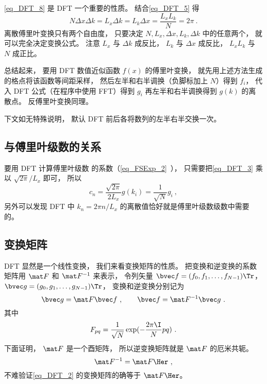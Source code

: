 \autoref{eq_DFT_8} 是 DFT 一个重要的性质。 结合\autoref{eq_DFT_5} 得
\begin{equation}\label{eq_DFT_9}
N\Delta x \Delta k = L_x \Delta k = L_k \Delta x = \frac{L_x L_k}{N} = 2\pi~.
\end{equation}
离散傅里叶变换只有两个自由度， 只要决定 $N, L_x, \Delta x, L_k, \Delta k$ 中的任意两个， 就可以完全决定变换公式。 注意 $L_x$ 与 $\Delta k$ 成反比， $L_k$ 与 $\Delta x$ 成反比， $L_xL_k$ 与 $N$ 成正比。

总结起来， 要用 DFT 数值近似函数 $f(x)$ 的傅里叶变换， 就先用上述方法生成的格点将该函数等间距采样， 然后左半和右半调换（负脚标加上 $N$）得到 $f_i$， 代入 DFT 公式（在程序中使用 FFT）得到 $g_i$ 再左半和右半调换得到 $g(k)$ 的离散点。 反傅里叶变换同理。

下文如无特殊说明， 默认 DFT 前后各将数列的左半右半交换一次。

\subsection{与傅里叶级数的关系}
要用 DFT 计算傅里叶级数 的系数（\autoref{eq_FSExp_2}~）， 只需要把\autoref{eq_DFT_3} 乘以 $\sqrt{2\pi}/L_x$ 即可， 所以
\begin{equation}\label{eq_DFT_10}
c_n = \frac{\sqrt{2\pi}}{2L_x} g(k_i) = \frac{1}{\sqrt{N}} g_i~,
\end{equation}
另外可以发现 DFT 中 $k_n = 2\pi n/L_x$ 的离散值恰好就是傅里叶级数级数中需要的。

\subsection{变换矩阵}
DFT 显然是一个线性变换， 我们来看变换矩阵的性质。 把变换和逆变换的系数矩阵用
 $\mat F$ 和 $\mat F^{-1}$ 来表示， 令列矢量 $\bvec f = (f_0,f_1,\dots,f_{N-1})\Tr$， $\bvec g = (g_0,g_1,\dots,g_{N-1})\Tr$， 变换和逆变换分别记为
\begin{equation}
\bvec g = \mat F \bvec f ~,\qquad
\bvec f = \mat F^{-1} \bvec g~.
\end{equation}
其中
\begin{equation}
F_{pq} = \frac{1}{\sqrt{N}} \exp(-\frac{2\pi\I}{N} p q)~.
\end{equation}
下面证明， $\mat F$ 是一个酉矩阵， 所以逆变换矩阵就是 $\mat F$ 的厄米共轭。
\begin{equation}
\mat F^{-1} = \mat F\Her~,
\end{equation}
不难验证\autoref{eq_DFT_2} 的变换矩阵的确等于 $\mat F\Her$。


